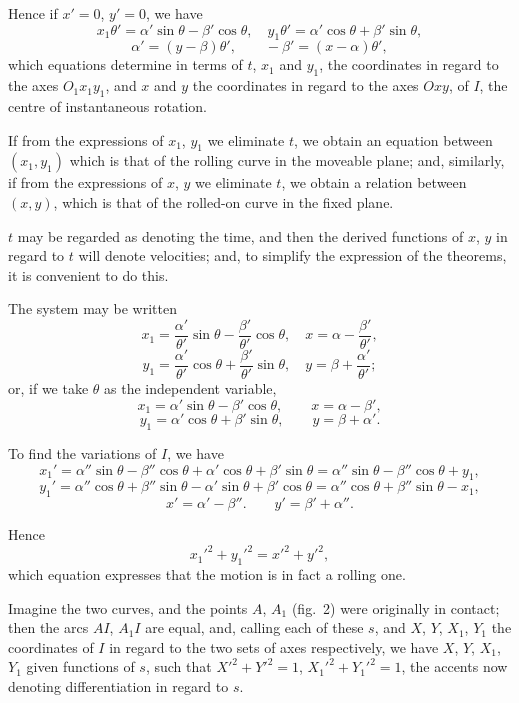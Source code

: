 \documentclass[11pt,a4paper]{book}
\begin{document}
Hence if $x'=0$, $y'=0$, we have
\[
x_1\theta' = \alpha'\sin\theta - \beta'\cos\theta,\quad
y_1\theta' = \alpha'\cos\theta + \beta'\sin\theta,
\]
\[
\alpha' = (y-\beta)\theta',\qquad -\beta' = (x-\alpha)\theta',
\]
which equations determine in terms of $t$, $x_1$ and $y_1$, the coordinates
in regard to the axes $O_1x_1y_1$, and $x$ and $y$ the coordinates in regard
to the axes $Oxy$, of $I$, the centre of instantaneous rotation.

If from the expressions of $x_1$, $y_1$ we eliminate $t$, we obtain an equation
between $(x_1,y_1)$ which is that of the rolling curve in the moveable plane;
and, similarly, if from the expressions of $x$, $y$ we eliminate $t$, we obtain
a relation between $(x,y)$, which is that of the rolled-on curve in the fixed
plane.

$t$ may be regarded as denoting the time, and then the derived functions
of $x$, $y$ in regard to $t$ will denote velocities; and, to simplify the
expression of the theorems, it is convenient to do this.

The system may be written
\[
x_1 = \frac{\alpha'}{\theta'}\sin\theta - \frac{\beta'}{\theta'}\cos\theta,
\quad x = \alpha - \frac{\beta'}{\theta'},
\]
\[
y_1 = \frac{\alpha'}{\theta'}\cos\theta + \frac{\beta'}{\theta'}\sin\theta,
\quad y = \beta + \frac{\alpha'}{\theta'};
\]
or, if we take $\theta$ as the independent variable,
\[
x_1 = \alpha'\sin\theta - \beta'\cos\theta,\qquad
x = \alpha - \beta',
\]
\[
y_1 = \alpha'\cos\theta + \beta'\sin\theta,\qquad
y = \beta + \alpha'.
\]

To find the variations of $I$, we have
\[
x_1' = \alpha''\sin\theta - \beta''\cos\theta + \alpha'\cos\theta + \beta'\sin\theta
= \alpha''\sin\theta - \beta''\cos\theta + y_1,
\]
\[
y_1' = \alpha''\cos\theta + \beta''\sin\theta - \alpha'\sin\theta + \beta'\cos\theta
= \alpha''\cos\theta + \beta''\sin\theta - x_1,
\]
\[
x' = \alpha' - \beta''.\qquad y' = \beta' + \alpha''.
\]

Hence
\[
x_1'^2 + y_1'^2 = x'^2 + y'^2,
\]
which equation expresses that the motion is in fact a rolling one.

Imagine the two curves, and the points $A$, $A_1$ (fig.~2) were originally
in contact; then the arcs $AI$, $A_1I$ are equal, and, calling each of these
$s$, and $X$, $Y$, $X_1$, $Y_1$ the coordinates of $I$ in regard to the two sets
of axes respectively, we have $X$, $Y$, $X_1$, $Y_1$ given functions of $s$,
such that $X'^2+Y'^2=1$, $X_1'^2+Y_1'^2=1$, the accents now denoting
differentiation in regard to $s$.
\end{document}
